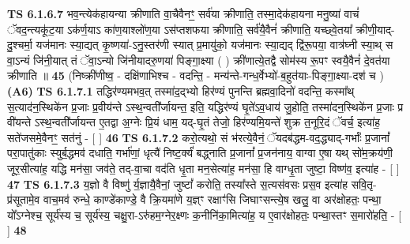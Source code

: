 \documentclass[17pt]{extarticle}
\begin{document}
                  \newline
                                \textbf{ TS 6.1.6.7} \newline
                  भव॒न्त्येक॑हायन्या क्रीणाति वा॒चैवैनꣳ॒॒ सर्व॑या क्रीणाति॒ तस्मा॒देक॑हायना मनु॒ष्या॑ वाचं॑ ॅवद॒न्त्यकू॑ट॒या ऽक॑र्ण॒याऽ का॑ण॒याश्लो॑ण॒या ऽस॑प्तशफया क्रीणाति॒ सर्व॑यै॒वैनं॑ क्रीणाति॒ यच्छ्वे॒तया᳚ क्रीणी॒याद्-दु॒श्चर्मा॒ यज॑मानः स्या॒द्यत् कृ॒ष्णया॑-ऽनु॒स्तर॑णी स्यात् प्र॒मायु॑को॒ यज॑मानः स्या॒द्यद् द्वि॑रू॒पया॒ वात्र॑घ्नी स्या॒थ् स वा॒ऽन्यं जि॑नी॒यात् तं ॅवा॒ऽन्यो जि॑नीयादरु॒णया॑ पिङ्गा॒क्ष्या ( ) क्री॑णात्ये॒तद्वै सोम॑स्य रू॒पꣳ स्वयै॒वैनं॑ दे॒वत॑या क्रीणाति ॥ \textbf{  45 } \newline
                  \newline
                      (निष्क्री॑णीष्व॒ - दक्षि॑णाभिश्च - वदन्ति॒ - मन्य॑न्ते-गन्ध॒र्वेभ्यो॑-ब॒हुत॑याः-पिङ्गा॒क्ष्या-दश॑ च )  \textbf{(A6)} \newline \newline
                                        \textbf{ TS 6.1.7.1} \newline
                  तद्धिर॑ण्यमभव॒त् तस्मा॑द॒द्भ्यो हिर॑ण्यं पुनन्ति ब्रह्मवा॒दिनो॑ वदन्ति॒ कस्मा᳚थ् स॒त्याद॑न॒स्थिके॑न प्र॒जाः प्र॒वीय॑न्ते ऽस्थ॒न्वती᳚र्जायन्त॒ इति॒ यद्धिर॑ण्यं घृ॒ते॑ऽव॒धाय॑ जु॒होति॒ तस्मा॑दन॒स्थिके॑न प्र॒जाः प्र वी॑यन्ते ऽस्थ॒न्वती᳚र्जायन्त ए॒तद्वा अ॒ग्नेः प्रि॒यं धाम॒ यद्-घृ॒तं तेजो॒ हिर॑ण्यमि॒यन्ते॑ शुक्र त॒नूरि॒दं ॅवर्च॒ इत्या॑ह॒ सते॑जसमे॒वैनꣳ॒॒ सत॑नुं - [  ] \textbf{  46} \newline
                  \newline
                                \textbf{ TS 6.1.7.2} \newline
                  करो॒त्यथो॒ सं भ॑रत्ये॒वैनं॒ ॅयदब॑द्धम-वद॒द्ध्याद्-गर्भाः᳚ प्र॒जानां᳚ परा॒पातु॑काः स्युर्ब॒द्धमव॑ दधाति॒ गर्भा॑णां॒ धृत्यै॑ निष्ट॒र्क्यं॑ बद्ध्नाति प्र॒जानां᳚ प्र॒जन॑नाय॒ वाग्वा ए॒षा यथ् सो॑म॒क्रय॑णी॒ जूर॒सीत्या॑ह॒ यद्धि मन॑सा॒ जव॑ते॒ तद्-वा॒चा वद॑ति धृ॒ता मन॒सेत्या॑ह॒ मन॑सा॒ हि वाग्धृ॒ता जुष्टा॒ विष्ण॑व॒ इत्या॑ह - [  ] \textbf{  47} \newline
                  \newline
                                \textbf{ TS 6.1.7.3} \newline
                  य॒ज्ञो वै विष्णु॑ र्य॒ज्ञायै॒वैनां॒ जुष्टां᳚ करोति॒ तस्या᳚स्ते स॒त्यस॑वसः प्रस॒व इत्या॑ह सवि॒तृ-प्र॑सूतामे॒व वाच॒मव॑ रुन्धे॒ काण्डे॑काण्डे॒ वै क्रि॒यमा॑णे य॒ज्ञ्ꣳ रक्षाꣳ॑सि जिघाꣳसन्त्ये॒ष खलु॒ वा अर॑क्षोहतः॒ पन्था॒ यो᳚ऽग्नेश्च॒ सूर्य॑स्य च॒ सूर्य॑स्य॒ चक्षु॒रा-ऽरु॑हम॒ग्नेर॒क्ष्णः क॒नीनि॑का॒मित्या॑ह॒ य ए॒वार॑क्षोहतः॒ पन्था॒स्तꣳ स॒मारो॑हति॒ - [  ] \textbf{  48} \newline
\end{document}
